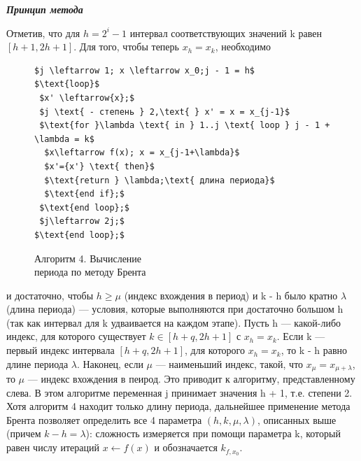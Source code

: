 \slshape{\textbf{Принцип метода}} \par
{} \par
\begin{figure}[h]
\end{figure}%
Отметив, что для $h = 2^{i} - 1$ интервал соответствующих значений k равен $[h + 1, 2h + 1]$. Для того, чтобы теперь $x_{h} = x_{k}$, необходимо
\begin{figure}
\begin{lstlisting}[mathescape=true]
$j \leftarrow 1; x \leftarrow x_0;j - 1 = h$
$\text{loop}$
 $x' \leftarrow{x};$
 $j \text{ - степень } 2,\text{ } x' = x = x_{j-1}$
 $\text{for }\lambda \text{ in } 1..j \text{ loop } j - 1 + \lambda = k$
  $x\leftarrow f(x); x = x_{j-1+\lambda}$
  $x'={x'} \text{ then}$
  $\text{return } \lambda;\text{ длина периода}$
  $\text{end if};$
 $\text{end loop};$
 $j\leftarrow 2j;$
$\text{end loop};$
\end{lstlisting}
Алгоритм 4. Вычисление\\
периода по методу Брента
\end{figure}
 и достаточно, чтобы $h \geqslant \mu$ (индекс вхождения в период) и k - h было  кратно $\lambda$ (длина периода) --- условия, которые выполняются при достаточно большом h (так как интервал для k удваивается на каждом этапе). Пусть h --- какой-либо индекс, для которого существует  $k \in [h + q, 2h + 1]$ с $x_{h} = x_{k}$. Если k --- первый индекс интервала $[h + q, 2h + 1]$, для которого $x_{h} = x_{k}$, то k - h равно длине периода $\lambda$. Наконец, если $\mu$ --- наименьший индекс, такой, что $x_{\mu} = x_{\mu + \lambda}$, то $\mu$ --- индекс вхождения в пеирод. Это приводит к алгоритму, представленному слева. В этом алгоритме переменная j принимает значения h + 1, т.е. степени 2. Хотя алгоритм 4 находит только длину периода, дальнейшее применение метода Брента позволяет определить все 4 параметра $(h, k, \mu, \lambda)$, описанных выше (причем $k - h = \lambda$): сложность измеряется при помощи параметра k, который равен числу итераций $x \leftarrow f(x)$ и обозначается $k_{f,x_{0}}$. \par 

